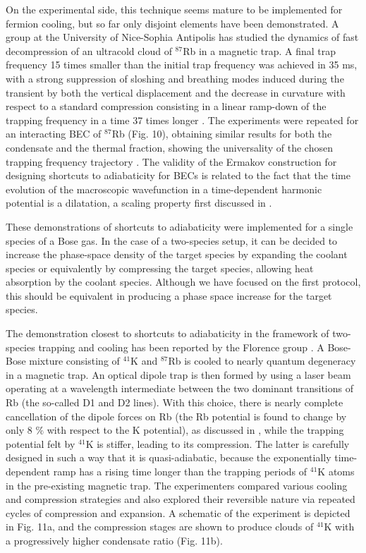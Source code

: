 \documentclass[pra,letterpaper,twocolumn,showpacs,superscriptaddress]{revtex4}
\begin{document}
On the experimental side, this technique seems mature to be implemented for fermion cooling, but 
so far only disjoint elements have been demonstrated. A group at the University of Nice-Sophia Antipolis 
has studied the dynamics of fast decompression of an ultracold cloud of ${}^{87}$Rb in a magnetic trap. 
A final trap frequency 15 times smaller than the initial trap frequency was achieved in 35 ms, with a strong 
suppression of sloshing and breathing modes induced during the transient by both the vertical displacement and the 
decrease in curvature with respect to a standard compression consisting in a linear ramp-down 
of the trapping frequency in a time 37 times longer \cite{Schaff2010}. 
The experiments were repeated for an interacting BEC of ${}^{87}$Rb (Fig. 10), obtaining 
similar results for both the condensate and the thermal fraction, showing the universality 
of the chosen trapping frequency trajectory \cite{Schaff2011,Schaff2011NJP}. 
The validity of the Ermakov construction for designing shortcuts to adiabaticity for BECs 
is related to the fact that the time evolution of the macroscopic wavefunction in a time-dependent harmonic 
potential is a dilatation, a scaling property first discussed in \cite{Castin1996}.

These demonstrations of shortcuts to adiabaticity were implemented for a single species of a Bose gas.
In the case of a two-species setup, it can be decided to increase the phase-space density of the 
target species by expanding the coolant species or equivalently by compressing the target 
species, allowing heat absorption by the coolant species. Although we have focused on 
the first protocol, this should be equivalent in producing a phase space increase for the target 
species. 

The demonstration closest to shortcuts to adiabaticity in the framework of two-species 
trapping and cooling has been reported by the Florence group \cite{Catani2009}. 
A Bose-Bose mixture consisting of ${}^{41}$K and ${}^{87}$Rb is cooled to nearly quantum 
degeneracy in a magnetic trap. An optical dipole trap is then formed by using a laser 
beam operating at a wavelength intermediate between the two dominant transitions of Rb 
(the so-called D1 and D2 lines). With this choice, there is nearly complete cancellation 
of the dipole forces on Rb (the Rb potential is found to change by only 8 $\%$ with respect 
to the K potential), as discussed in \cite{LeBlanc2007}, while the trapping potential felt 
by ${}^{41}$K is stiffer, leading to its compression. The latter is carefully designed in 
such a way that it is quasi-adiabatic, because the exponentially time-dependent 
ramp has a rising time longer than the trapping periods of ${}^{41}$K atoms in the pre-existing 
magnetic trap. The experimenters compared various cooling and compression strategies and 
also explored their reversible nature via repeated cycles of compression and expansion.  
A schematic of the experiment is depicted in Fig. 11a, and the compression stages   
are shown to produce clouds of ${}^{41}$K with a progressively higher condensate ratio (Fig. 11b). 
\end{document}

